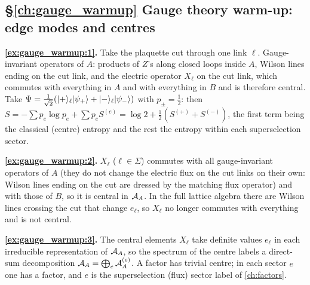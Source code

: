 {\subsection*{\S\ref{ch:gauge_warmup} Gauge theory warm-up: edge modes and centres}
\textbf{\ref{ex:gauge_warmup:1}.} Take the plaquette cut through one link $\ell$. Gauge-invariant operators of $A$: products of $Z$'s along closed loops inside $A$, Wilson lines ending on the cut link, and the electric operator $X_\ell$ on the cut link, which commutes with everything in $A$ and with everything in $B$ and is therefore central. Take $\Psi=\frac1{\sqrt2}(\lvert +\rangle_\ell\lvert \psi_+\rangle+\lvert -\rangle_\ell\lvert \psi_-\rangle)$ with $p_\pm=\frac12$: then $S=-\sum p_e\log p_e+\sum p_eS^{(e)}=\log2+\frac12(S^{(+)}+S^{(-)})$, the first term being the classical (centre) entropy and the rest the entropy within each superselection sector.\par
\textbf{\ref{ex:gauge_warmup:2}.} $X_\ell$ ($\ell\in\Sigma$) commutes with all gauge-invariant operators of $A$ (they do not change the electric flux on the cut links on their own: Wilson lines ending on the cut are dressed by the matching flux operator) and with those of $B$, so it is central in $\mathcal{A}_A$. In the full lattice algebra there are Wilson lines crossing the cut that change $e_\ell$, so $X_\ell$ no longer commutes with everything and is not central.\par
\textbf{\ref{ex:gauge_warmup:3}.} The central elements $X_\ell$ take definite values $e_\ell$ in each irreducible representation of $\mathcal{A}_A$, so the spectrum of the centre labels a direct-sum decomposition $\mathcal{A}_A=\bigoplus_e\mathcal{A}_A^{(e)}$. A factor has trivial centre; in each sector $e$ one has a factor, and $e$ is the superselection (flux) sector label of \cref{ch:factors}.\par

}
